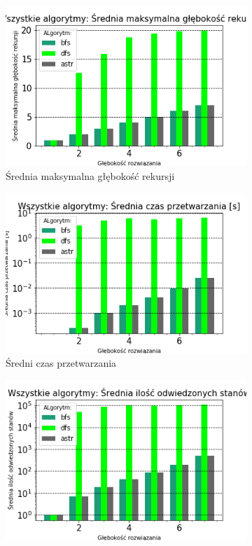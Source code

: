 \documentclass{classrep}
\begin{document}
\begin{figure}[H]
    \begin{subfigure}[t]{0.45\textwidth}
        \includegraphics[width=\textwidth]{charts/ALL_recursed.png}
        \caption{Średnia maksymalna głębokość rekursji}
        \label{ALL:rescursed}
    \end{subfigure}
    \begin{subfigure}[t]{0.45\textwidth}
        \includegraphics[width=\textwidth]{charts/ALL_time.png}
        \caption{Średni czas przetwarzania}
        \label{ALL:time}
    \end{subfigure}
    \begin{subfigure}[t]{0.45\textwidth}
        \includegraphics[width=\textwidth]{charts/ALL_visited.png}

\end{subfigure}
\end{figure}
\end{document}
